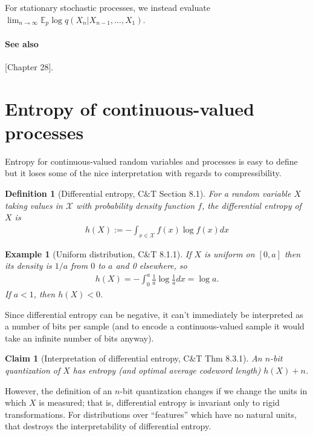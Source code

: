 \documentclass{article}
\newtheorem{claim}{Claim}
\newtheorem{mydef}{Definition}
\newtheorem{myex}{Example}
\newcommand{\E}{\mathbb{E}}
\begin{document}
    For stationary stochastic processes, we instead evaluate $\lim_{n \to
        \infty} \E_p \log q(X_n | X_{n-1}, \ldots, X_1)$.

    \paragraph{See also} \citet{mackay2003information}[Chapter 28].

    \section{Entropy of continuous-valued processes}
    \label{sec:differential-entropy}
    Entropy for continuous-valued random variables and processes is easy to
    define but it loses some of the nice interpretation with regards to
    compressibility.

    \begin{mydef}[Differential entropy, C\&T Section 8.1]
        For a random variable $X$ taking values in $\mathcal{X}$ with
        probability density function $f$, the \emph{differential entropy} of
        $X$ is
        \begin{align}
            h(X) := - \int_{x \in \mathcal{X}} f(x) \log f(x) dx
        \end{align}
    \end{mydef}

    \begin{myex}[Uniform distribution, C\&T 8.1.1]
        If $X$ is uniform on $[0,a]$ then its density is $1/a$ from $0$ to $a$
        and 0 elsewhere, so
        \begin{align}
            h(X) = -\int_0^a \frac{1}{a} \log \frac{1}{a} dx = \log a.
        \end{align}
        If $a<1$, then $h(X) < 0$.
    \end{myex}

    Since differential entropy can be negative, it can't immediately be
    interpreted as a number of bits per sample (and to encode a
    continuous-valued sample it would take an infinite number of bits anyway).

    \begin{claim}[Interpretation of differential entropy, C\&T Thm 8.3.1]
        An $n$-bit quantization of $X$ has entropy (and optimal average
        codeword length) $h(X)+n$.
    \end{claim}

    However, the definition of an $n$-bit quantization changes if we change the
    units in which $X$ is measured; that is, differential entropy is invariant
    only to rigid transformations. For distributions over ``features'' which
    have no natural units, that destroys the interpretability of differential
    entropy.
\end{document}
